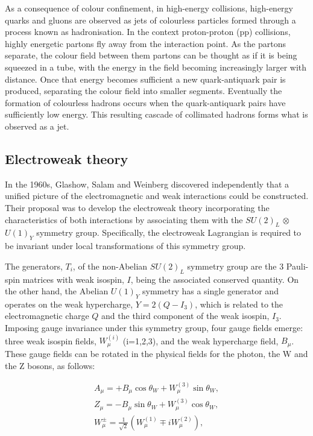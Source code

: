 As a consequence of colour confinement, in high-energy collisions, high-energy quarks and gluons are observed as jets of colourless particles formed through a process known as hadronisation. In the context proton-proton (pp) collisions, highly energetic partons fly away from the interaction point. As the partons separate, the colour field between them partons can be thought as if it is being squeezed in a tube, with the energy in the field becoming increasingly larger with distance. Once that energy becomes sufficient a new quark-antiquark pair is produced, separating the colour field into smaller segments. Eventually the formation of colourless hadrons occurs when the quark-antiquark pairs have sufficiently low energy. This resulting cascade of collimated hadrons forms what is observed as a jet.

\subsection{Electroweak theory}

In the 1960s, Glashow, Salam and Weinberg discovered independently that a unified picture of the electromagnetic and weak interactions could be constructed. Their proposal was to develop the electroweak theory incorporating the characteristics of both interactions by associating them with the $SU(2)_{L}$ $\otimes$ $U(1)_{Y}$ symmetry group. Specifically, the electroweak Lagrangian is required to be invariant under local transformations of this symmetry group.

The generators, $T_{i}$, of the non-Abelian $SU(2)_{L}$ symmetry group are the 3 Pauli-spin matrices with weak isospin, $I$, being the associated conserved quantity. On the other hand, the Abelian $U(1)_{Y}$ symmetry has a single generator and operates on the weak hypercharge, $Y = 2(Q-I_{3})$, which is related to the electromagnetic charge $Q$ and the third component of the weak isospin, $I_{3}$. Imposing gauge invariance under this symmetry group, four gauge fields emerge: three weak isospin fields, $W_{\mu}^{(i)}$ (i=1,2,3), and the weak hypercharge field, $B_{\mu}$. These gauge fields can be rotated in the physical fields for the photon, the W and the Z bosons, as follows:

\begin{equation}
\begin{array}{c}
A_{\mu} = + B_{\mu} \cos{\theta_{W}} + W_{\mu}^{(3)} \sin{\theta_{W}}, \\
Z_{\mu} = - B_{\mu} \sin{\theta_{W}} + W_{\mu}^{(3)} \cos{\theta_{W}}, \\
W_{\mu}^{\pm} = \frac{1}{\sqrt{2}} (W_{\mu}^{(1)} \mp iW_{\mu}^{(2)}),
\end{array}
\label{Equation:Introduction_PhysicalGaugeFields}
\end{equation}

